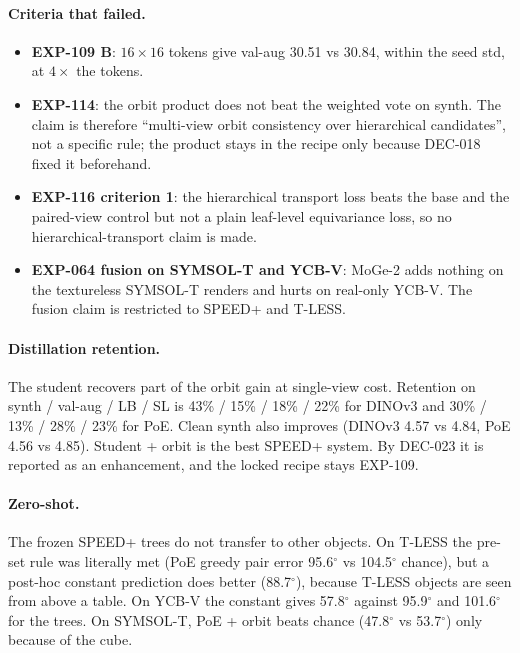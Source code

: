 \paragraph{Criteria that failed.}
\begin{itemize}
  \item \textbf{EXP-109 B}: $16\times16$ tokens give val-aug 30.51 vs 30.84, within the seed std, at $4\times$ the tokens.
  \item \textbf{EXP-114}: the orbit product does not beat the weighted vote on synth. The claim is therefore ``multi-view orbit consistency over hierarchical candidates'', not a specific rule; the product stays in the recipe only because DEC-018 fixed it beforehand.
  \item \textbf{EXP-116 criterion 1}: the hierarchical transport loss beats the base and the paired-view control but not a plain leaf-level equivariance loss, so no hierarchical-transport claim is made.
  \item \textbf{EXP-064 fusion on SYMSOL-T and YCB-V}: MoGe-2 adds nothing on the textureless SYMSOL-T renders and hurts on real-only YCB-V. The fusion claim is restricted to SPEED+ and T-LESS.
\end{itemize}

\paragraph{Distillation retention.}
The student recovers part of the orbit gain at single-view cost. Retention on synth / val-aug / LB / SL is 43\% / 15\% / 18\% / 22\% for DINOv3 and 30\% / 13\% / 28\% / 23\% for PoE. Clean synth also improves (DINOv3 4.57 vs 4.84, PoE 4.56 vs 4.85). Student + orbit is the best SPEED+ system. By DEC-023 it is reported as an enhancement, and the locked recipe stays EXP-109.

\paragraph{Zero-shot.}
The frozen SPEED+ trees do not transfer to other objects. On T-LESS the pre-set rule was literally met (PoE greedy pair error 95.6$^\circ$ vs 104.5$^\circ$ chance), but a post-hoc constant prediction does better (88.7$^\circ$), because T-LESS objects are seen from above a table. On YCB-V the constant gives 57.8$^\circ$ against 95.9$^\circ$ and 101.6$^\circ$ for the trees. On SYMSOL-T, PoE + orbit beats chance (47.8$^\circ$ vs 53.7$^\circ$) only because of the cube.

